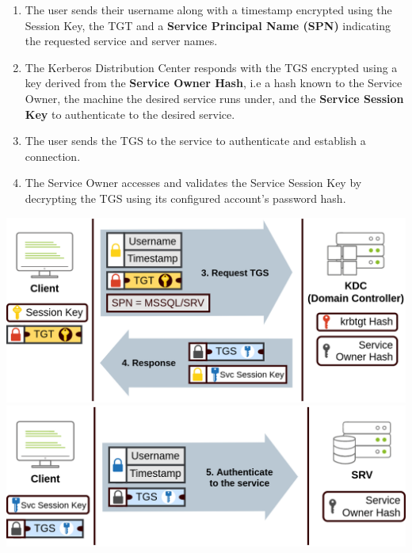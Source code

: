 {\begin{enumerate}[resume]
\item The user sends their username along with a timestamp encrypted using the Session Key, the TGT and a \textbf{Service Principal Name (SPN)} indicating the requested service and server names. 
\item The Kerberos Distribution Center responds with the TGS encrypted using a key derived from the \textbf{Service Owner Hash}, i.e a hash known to the Service Owner, the machine the desired service runs under, and the \textbf{Service Session Key} to authenticate to the desired service.
\item The user sends the TGS to the service to authenticate and establish a connection.
\item The Service Owner accesses and validates the Service Session Key by decrypting the TGS using its configured account's password hash.
\end{enumerate}
\includegraphics[scale=0.35]{Complete_Beginner_Path/Windows_Exploitation_Basics_Room/AD_Authentication_2.png}\\
\includegraphics[scale=0.35]{Complete_Beginner_Path/Windows_Exploitation_Basics_Room/AD_Authentication_3.png}\\

}
